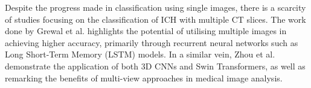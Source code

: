 

Despite the progress made in classification using single images, there is a scarcity of studies focusing on the classification of ICH with multiple CT slices. The work done by Grewal et al. \cite{8363574} highlights the potential of utilising multiple images in achieving higher accuracy, primarily through recurrent neural networks such as Long Short-Term Memory (LSTM) models. In a similar vein, Zhou et al. \cite{Zhou2024} demonstrate the application of both 3D CNNs and Swin Transformers, as well as remarking the benefits of multi-view approaches in medical image analysis.

